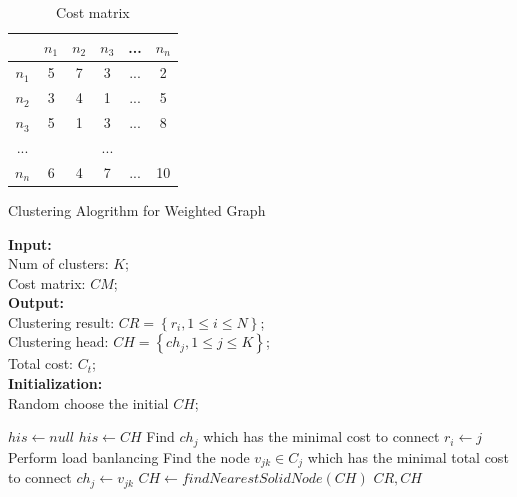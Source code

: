 \documentclass[conference]{IEEEtran}
\begin{document}
\begin{table}[htbp]
\centering
\begin{tabular}{|c|c|c|c|c|c|}
\hline
 & $n_1$ & $n_2$ & $n_3$ & ... & $n_n$ \\
\hline
$n_1$ & 5 & 7 & 3 & ... & 2 \\
\hline
$n_2$ & 3 & 4 & 1 & ... & 5 \\
\hline
$n_3$ & 5 & 1 & 3 & ... & 8 \\
\hline
... & \multicolumn{5}{c|}{...} \\
\hline
$n_n$ & 6 & 4 & 7 & ... & 10 \\
\hline
\end{tabular}
\caption{Cost matrix}
\label{cost_matrix}
\end{table}

\begin{algorithm}[htbp]
\caption{Clustering Alogrithm for Weighted Graph}
{\bf Input:}\\
\hspace*{0.1in}Num of clusters: $K$;\\
\hspace*{0.1in}Cost matrix: $CM$;\\
{\bf Output:}\\
\hspace*{0.1in}Clustering result: $CR=\left \{ r_{i}, 1 \leqslant i \leqslant N \right \}$;\\
\hspace*{0.1in}Clustering head: $CH=\left \{ ch_{j}, 1 \leqslant j \leqslant K \right \}$;\\
\hspace*{0.1in}Total cost: $C_t$;\\
{\bf Initialization:}\\
\hspace*{0.1in}Random choose the initial $CH$;
\begin{algorithmic}[1]
\State $his \leftarrow null$
    \State $his \leftarrow CH$
        \State Find $ch_j$ which has the minimal cost to connect
        \State $r_i \leftarrow j$
    \EndFor
    \State Perform load banlancing
        \State Find the node $v_{jk} \in C_j$ which has the minimal total cost to connect
        \State $ch_j \leftarrow v_{jk}$
    \EndFor
\EndWhile
\State $CH \leftarrow findNearestSolidNode(CH)$
\State \Return $CR, CH$
\end{algorithmic}
\end{algorithm}
\end{document}
